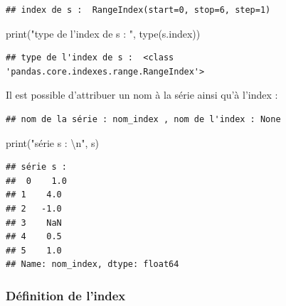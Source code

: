 \documentclass[12pt,]{book}
\newenvironment{Shaded}{\begin{snugshade}}{\end{snugshade}}
\newcommand{\CharTok}[1]{\textcolor[rgb]{0.31,0.60,0.02}{#1}}
\newcommand{\SpecialCharTok}[1]{\textcolor[rgb]{0.00,0.00,0.00}{#1}}
\newcommand{\StringTok}[1]{\textcolor[rgb]{0.31,0.60,0.02}{#1}}
\newcommand{\OperatorTok}[1]{\textcolor[rgb]{0.81,0.36,0.00}{\textbf{#1}}}
\newcommand{\BuiltInTok}[1]{#1}
\newcommand{\NormalTok}[1]{#1}
\numberwithin{equation}{section}
\numberwithin{countremarque}{section}
\begin{document}
\begin{lstlisting}
## index de s :  RangeIndex(start=0, stop=6, step=1)
\end{lstlisting}

\begin{Shaded}
\begin{Highlighting}[]
\BuiltInTok{print}\NormalTok{(}\StringTok{"type de l'index de s : "}\NormalTok{, }\BuiltInTok{type}\NormalTok{(s.index))}
\end{Highlighting}
\end{Shaded}

\begin{lstlisting}
## type de l'index de s :  <class 'pandas.core.indexes.range.RangeIndex'>
\end{lstlisting}

Il est possible d'attribuer un nom à la série ainsi qu'à l'index :

\begin{Shaded}
\end{Shaded}

\begin{lstlisting}
## nom de la série : nom_index , nom de l'index : None
\end{lstlisting}

\begin{Shaded}
\begin{Highlighting}[]
\BuiltInTok{print}\NormalTok{(}\StringTok{"série s : }\CharTok{\textbackslash{}n}\StringTok{"}\NormalTok{, s)}
\end{Highlighting}
\end{Shaded}

\begin{lstlisting}
## série s : 
##  0    1.0
## 1    4.0
## 2   -1.0
## 3    NaN
## 4    0.5
## 5    1.0
## Name: nom_index, dtype: float64
\end{lstlisting}

\subsubsection{Définition de l'index}\label{definition-de-lindex}
\end{document}
